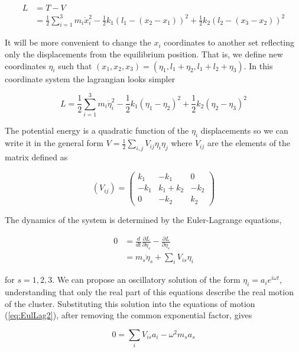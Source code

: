\begin{align}
L & = T-V\\
  & = \frac{1}{2}\sum_{i=1}^3 m_i \dot{x}_i^2 - \frac{1}{2}k_1(l_1-(x_2-x_1))^2+\frac{1}{2}k_2(l_2-(x_3-x_2))^2
\end{align}

It will be more convenient to change the $x_i$ coordinates to another set reflecting only the displacements from the equilibrium position.
That is, we define new coordinates $\eta_i$ such that $(x_1,x_2,x_3)=(\eta_1,l_1+\eta_2,l_1+l_2+\eta_3)$. 
In this coordinate system the lagrangian looks simpler

\begin{equation}
L= \frac{1}{2}\sum_{i=1}^3 m_i \dot{\eta}_i^2-\frac{1}{2}k_1(\eta_1-\eta_2)^2+\frac{1}{2}k_2(\eta_2-\eta_3)^2
\end{equation}

The potential energy is a quadratic function of the $\eta_i$ displacements so we can write it in the general form $V=\frac{1}{2}\sum_{i,j}V_{ij}\eta_i\eta_j$ where $V_{ij}$ are the elements of the matrix defined as

\begin{equation}
(V_{ij})=\left( \begin{array}{ccc} k_1 & -k_1 & 0 \\ -k_1 & k_1+k_2 & -k_2 \\ 0 & -k_2 & k_2 \end{array} \right)
\end{equation}

The dynamics of the system is determined by the Euler-Lagrange equations,

\begin{align}
0 & = \frac{d}{dt}\frac{\partial L}{\partial \dot{\eta}_s}-\frac{\partial L}{\partial \eta_s} \label{eq:EulLag1} \\
  & = m_s \ddot{\eta}_s + \sum_i V_{is} \eta_i \label{eq:EulLag2}
\end{align}

\noindent for $s=1,2,3$. 
We can propose an oscillatory solution of the form $\eta_i=a_ie^{i\omega t}$, understanding that only the real part of this equations describe the real motion of the cluster. 
Substituting this solution into the equations of motion (\ref{eq:EulLag2}), after removing the common exponential factor, gives

\begin{equation}
0=\sum_i V_{is}a_i-\omega^2m_sa_s
\end{equation}

